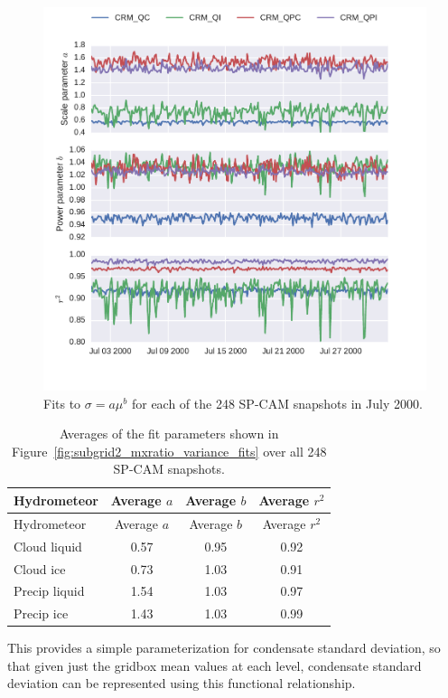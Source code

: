 \begin{figure}[htbp]
\centering
\includegraphics{graphics/subgrid2_mxratio_variance_fits.pdf}
\caption{\label{fig:subgrid2_mxratio_variance_fits}Fits to
\(\sigma = a \mu^b\) for each of the 248 SP-CAM snapshots in July
2000.}\label{fig:subgrid2ux5fmxratioux5fvarianceux5ffits}
\end{figure}

\begin{longtable}[]{@{}lccc@{}}
\caption{\label{tbl:subgrid2_mxratio_variance_fits_table}Averages of the
fit parameters shown in Figure~\ref{fig:subgrid2_mxratio_variance_fits}
over all 248 SP-CAM snapshots. }\tabularnewline
\toprule
Hydrometeor & Average \(a\) & Average \(b\) & Average
\(r^2\)\tabularnewline
\midrule
\endfirsthead
\toprule
Hydrometeor & Average \(a\) & Average \(b\) & Average
\(r^2\)\tabularnewline
\midrule
\endhead
Cloud liquid & 0.57 & 0.95 & 0.92\tabularnewline
Cloud ice & 0.73 & 1.03 & 0.91\tabularnewline
Precip liquid & 1.54 & 1.03 & 0.97\tabularnewline
Precip ice & 1.43 & 1.03 & 0.99\tabularnewline
\bottomrule
\end{longtable}

This provides a simple parameterization for condensate standard
deviation, so that given just the gridbox mean values at each level,
condensate standard deviation can be represented using this functional
relationship.

